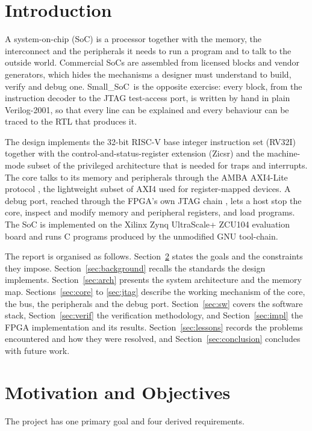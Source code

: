 \documentclass[journal,10pt]{IEEEtran}
\newcommand{\soc}{Small\_SoC}
\begin{document}
\section{Introduction}
A system-on-chip (SoC) is a processor together with the memory, the
interconnect and the peripherals it needs to run a program and to talk to the
outside world. Commercial SoCs are assembled from licensed blocks and vendor
generators, which hides the mechanisms a designer must understand to build,
verify and debug one. \soc\ is the opposite exercise: every block, from the
instruction decoder to the JTAG test-access port, is written by hand in plain
Verilog-2001, so that every line can be explained and every behaviour can be
traced to the RTL that produces it.

The design implements the 32-bit RISC-V base integer instruction set (RV32I)
\cite{riscv-unpriv} together with the control-and-status-register extension
(Zicsr) and the machine-mode subset of the privileged architecture
\cite{riscv-priv} that is needed for traps and interrupts. The core talks to
its memory and peripherals through the AMBA AXI4-Lite protocol \cite{axi},
the lightweight subset of AXI4 used for register-mapped devices. A debug
port, reached through the FPGA's own JTAG chain \cite{ieee1149}, lets a host
stop the core, inspect and modify memory and peripheral registers, and load
programs. The SoC is implemented on the Xilinx Zynq UltraScale+ ZCU104
evaluation board \cite{ug1267} and runs C programs produced by the unmodified
GNU tool-chain.

The report is organised as follows. Section~\ref{sec:motivation} states the
goals and the constraints they impose. Section~\ref{sec:background} recalls
the standards the design implements. Section~\ref{sec:arch} presents the
system architecture and the memory map. Sections~\ref{sec:core} to
\ref{sec:jtag} describe the working mechanism of the core, the bus, the
peripherals and the debug port. Section~\ref{sec:sw} covers the software
stack, Section~\ref{sec:verif} the verification methodology, and
Section~\ref{sec:impl} the FPGA implementation and its results.
Section~\ref{sec:lessons} records the problems encountered and how they were
resolved, and Section~\ref{sec:conclusion} concludes with future work.

\section{Motivation and Objectives}\label{sec:motivation}
The project has one primary goal and four derived requirements.
\end{document}
